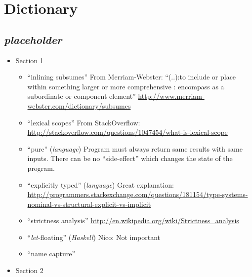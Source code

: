 
\section{Dictionary}


\subsection{\textit{placeholder}}

\begin{itemize}

	\item Section 1
\begin{itemize}

	\item ``inlining subsumes''
From Merriam-Webster: ``(..):to include or place within something larger or
more comprehensive :  encompass as a subordinate or component element''
\url{http://www.merriam-webster.com/dictionary/subsumes}

	\item ``lexical scopes''
From StackOverflow:
\url{http://stackoverflow.com/questions/1047454/what-is-lexical-scope}

	\item ``pure'' (\textit{language})
Program must always return same results with same inputs. There can be no
``side-effect'' which changes the state of the program.

	\item ``explicitly typed'' (\textit{language})
Great explanation: \url{http://programmers.stackexchange.com/questions/181154/type-systems-nominal-vs-structural-explicit-vs-implicit}

	\item ``strictness analysis''
\url{http://en.wikipedia.org/wiki/Strictness_analysis}

	\item ``\textit{let}-floating'' (\textit{Haskell})
Nico: Not important

	\item ``name capture''

\end{itemize}

	\item Section 2
\begin{itemize}


\end{itemize}
\end{itemize}
